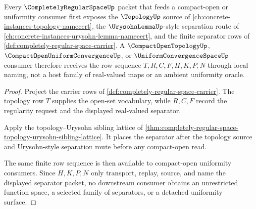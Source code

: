 \begin{theorem}
\label{thm:completely-regular-space-topology-uniformity-route}
Every $\CompletelyRegularSpaceUp$ packet that feeds a compact-open or uniformity consumer first exposes the $\TopologyUp$ source of \autoref{ch:concrete-instances-topology-namecert}, the $\UrysohnLemmaUp$-style separation route of \autoref{ch:concrete-instances-urysohn-lemma-namecert}, and the finite separator rows of \autoref{def:completely-regular-space-carrier}. A $\CompactOpenTopologyUp$, $\CompactOpenUniformConvergenceUp$, or $\UniformConvergenceSpaceUp$ consumer therefore receives the row sequence $T,R,C,F,H,K,P,N$ through local naming, not a host family of real-valued maps or an ambient uniformity oracle.
\end{theorem}
\begin{proof}
Project the carrier rows of \autoref{def:completely-regular-space-carrier}. The topology row $T$ supplies the open-set vocabulary, while $R,C,F$ record the regularity request and the displayed real-valued separator.

Apply the topology--Urysohn sibling lattice of \autoref{thm:completely-regular-space-topology-urysohn-sibling-lattice}. It places the separator after the topology source and Urysohn-style separation route before any compact-open read.

The same finite row sequence is then available to compact-open uniformity consumers. Since $H,K,P,N$ only transport, replay, source, and name the displayed separator packet, no downstream consumer obtains an unrestricted function space, a selected family of separators, or a detached uniformity surface.
\end{proof}
